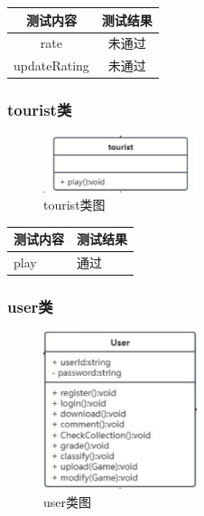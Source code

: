 \documentclass[12pt]{ctexart} %
\begin{document}
  \begin{table}[H]
  \centering  %
  \begin{tabular}{|c|c|}
    \hline
    测试内容 & 测试结果 \\
    \hline
    rate& 未通过 \\
    \hline
    updateRating& 未通过 \\
    \hline
  \end{tabular}
\end{table}

\subsubsection{tourist类}
\begin{figure}[H]
  \centering
  \includegraphics[width=0.4\textwidth]{tourist.png}
  \caption{tourist类图} %
\end{figure}
\begin{table}[H]
  \centering
  \begin{tabular}{|ll|}
    \hline
    测试内容 & 测试结果 \\
    \hline
    play& 通过 \\
    \hline
  \end{tabular}
\end{table}


\subsubsection{user类}
\begin{figure}[H]
  \centering
  \includegraphics[width=0.4\textwidth]{user.png}
  \caption{user类图} %
\end{figure}
\end{document}
